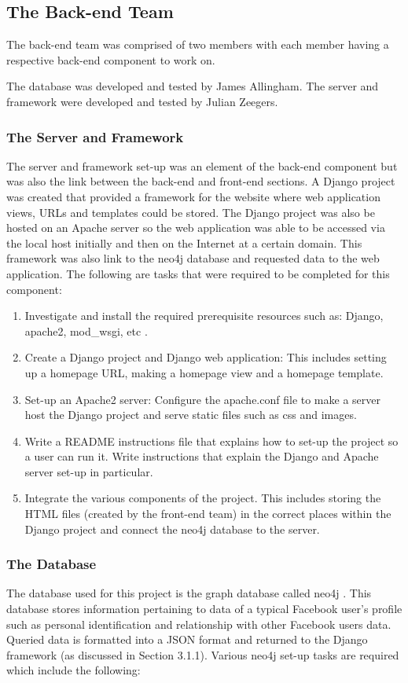 \documentclass[10pt,onecolumn]{article}
\begin{document}
\subsection{The Back-end Team}
The back-end team was comprised of two members with each member having a respective back-end component to work on.

The database was developed and tested by James Allingham. The server and framework were developed and tested by Julian Zeegers.

\subsubsection{The Server and Framework}
The server and framework set-up was an element of the back-end component but was also the link between the back-end and front-end sections. A Django project was created that provided a framework for the website where web application views, URLs and templates could be stored. The Django project was also be hosted on an Apache server so the web application was able to be accessed via the local host initially and then on the Internet at a certain domain. This framework was also link to the neo4j database and requested data to the web application. The following are tasks that were required to be completed for this component:

\begin{enumerate}
	\item Investigate and install the required prerequisite resources such as: Django, apache2, mod\_wsgi, etc \cite{django} \cite{wsgi} .
	\item Create a Django project and Django web application: This includes setting up a homepage URL, making a homepage view and a homepage template.
	\item Set-up an Apache2 server: Configure the apache.conf file to make a server host the Django project and serve static files such as css and images.
	\item Write a README instructions file that explains how to set-up the project so a user can run it. Write instructions that explain the Django and Apache server set-up in particular.
	\item Integrate the various components of the project. This includes storing the HTML files (created by the front-end team) in the correct places within the Django project and connect the neo4j database to the server.     
\end{enumerate}

\subsubsection{The Database}
The database used for this project is the graph database called neo4j \cite{neo4j}. This database stores information pertaining to data of a typical Facebook user's profile such as personal identification and relationship with other Facebook users data. Queried data is formatted into a JSON format and returned to the Django framework (as discussed in Section 3.1.1). Various neo4j set-up tasks are required which include the following:
\end{document}
